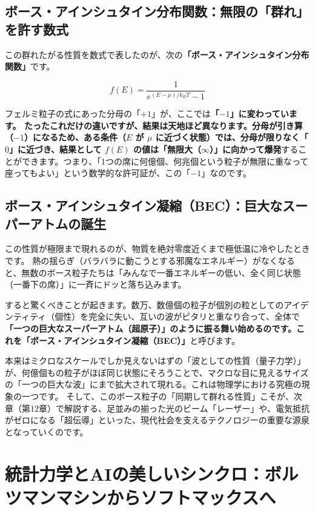 \subsection{ボース・アインシュタイン分布関数：無限の「群れ」を許す数式}

この群れたがる性質を数式で表したのが、次の\textbf{「ボース・アインシュタイン分布関数」}です。

\[
f(E) = \frac{1}{e^{(E-\mu)/k_B T}-1}
\]

フェルミ粒子の式にあった分母の「\(+1\)」が、ここでは\textbf{「\(-1\)」に変わっています。 たったこれだけの違いですが、結果は天地ほど異なります。分母が引き算（\(-1\)）になるため、ある条件（\(E\) が \(\mu\) に近づく状態）では、分母が限りなく「\(0\)」に近づき、結果として \(f(E)\) の値は「無限大（\(\infty\)）」に向かって爆発}することができます。つまり、「1つの席に何億個、何兆個という粒子が無限に重なって座ってもよい」という数学的な許可証が、この「\(-1\)」なのです。

\subsection{ボース・アインシュタイン凝縮（BEC）：巨大なスーパーアトムの誕生}

この性質が極限まで現れるのが、物質を絶対零度近くまで極低温に冷やしたときです。 熱の揺らぎ（バラバラに動こうとする邪魔なエネルギー）がなくなると、無数のボース粒子たちは「みんなで一番エネルギーの低い、全く同じ状態（一番下の席）」に一斉にドッと落ち込みます。

すると驚くべきことが起きます。数万、数億個の粒子が個別の粒としてのアイデンティティ（個性）を完全に失い、互いの波がピタリと重なり合って、全体で\textbf{「一つの巨大なスーパーアトム（超原子）」のように振る舞い始めるのです。これを「ボース・アインシュタイン凝縮（BEC）」}と呼びます。

本来はミクロなスケールでしか見えないはずの「波としての性質（量子力学）」が、何億個もの粒子がほぼ同じ状態にそろうことで、マクロな目に見えるサイズの「一つの巨大な波」にまで拡大されて現れる。これは物理学における究極の現象の一つです。 そして、このボース粒子の「同期して群れる性質」こそが、次章（第12章）で解説する、足並みの揃った光のビーム「レーザー」や、電気抵抗がゼロになる「超伝導」といった、現代社会を支えるテクノロジーの重要な源泉となっていくのです。

\section{統計力学とAIの美しいシンクロ：ボルツマンマシンからソフトマックスへ}

